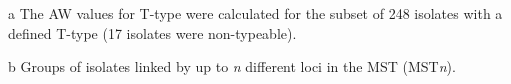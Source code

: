 \begin{table}[!ht]
{\begin{threeparttable}[b]
\begin{tabular}{@{}lllllllll@{}}
        \bottomrule
    \end{tabular}
    \begin{tablenotes}
       \item [a] {\footnotesize The \ac{AW} values for T-type were calculated for the subset of 248 isolates with a defined T-type (17 isolates were non-typeable).}
       \item [b] {\footnotesize Groups of isolates linked by up to \textit{n} different loci in the MST (MST\textit{n}).}
    \end{tablenotes}
    \end{threeparttable}
    }
\end{table}
